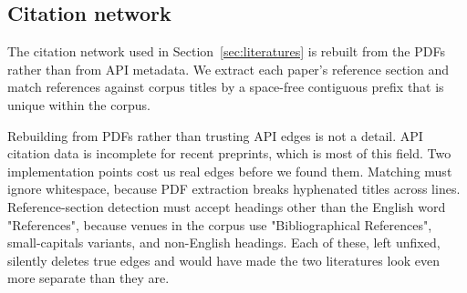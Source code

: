 \subsection{Citation network}

The citation network used in Section~\ref{sec:literatures} is rebuilt from the
PDFs rather than from API metadata. We extract each paper's reference section
and match references against corpus titles by a space-free contiguous prefix
that is unique within the corpus.

Rebuilding from PDFs rather than trusting API edges is not a detail. API
citation data is incomplete for recent preprints, which is most of this field.
Two implementation points cost us real edges before we found them. Matching
must ignore whitespace, because PDF extraction breaks hyphenated titles across
lines. Reference-section detection must accept headings other than the English
word "References", because venues in the corpus use
"Bibliographical References", small-capitals variants, and non-English
headings. Each of these, left unfixed, silently deletes true edges and would
have made the two literatures look even more separate than they are.
